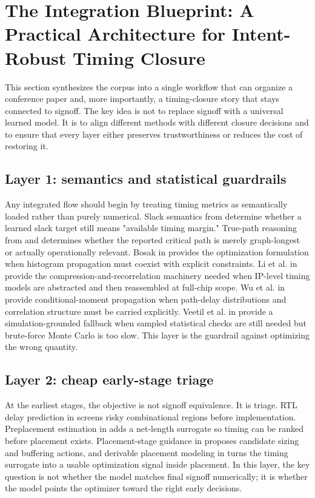 \documentclass[num-refs]{wiley-article}
\begin{document}
  \section{The Integration Blueprint: A Practical Architecture for Intent-Robust Timing Closure}

  This section synthesizes the corpus into a single workflow that can organize a conference paper and, more importantly, a timing-closure story that stays connected to signoff. The key idea is not to replace signoff with a universal learned model. It is to align different methods with different closure decisions and to ensure that every layer either preserves trustworthiness or reduces the cost of restoring it.


  \subsection{Layer 1: semantics and statistical guardrails}

  Any integrated flow should begin by treating timing metrics as semantically loaded rather than purely numerical. Slack semantics from \cite{ref50} determine whether a learned slack target still means "available timing margin." True-path reasoning from \cite{ref37} and \cite{ref40} determines whether the reported critical path is merely graph-longest or actually operationally relevant. Bosak in \cite{ref18} provides the optimization formulation when histogram propagation must coexist with explicit constraints. Li et al. in \cite{ref43} provide the compression-and-recorrelation machinery needed when IP-level timing models are abstracted and then reassembled at full-chip scope. Wu et al. in \cite{ref45} provide conditional-moment propagation when path-delay distributions and correlation structure must be carried explicitly. Veetil et al. in \cite{ref47} provide a simulation-grounded fallback when sampled statistical checks are still needed but brute-force Monte Carlo is too slow. This layer is the guardrail against optimizing the wrong quantity.


  \subsection{Layer 2: cheap early-stage triage}

  At the earliest stages, the objective is not signoff equivalence. It is triage. RTL delay prediction in \cite{ref27} screens risky combinational regions before implementation. Preplacement estimation in \cite{ref29} adds a net-length surrogate so timing can be ranked before placement exists. Placement-stage guidance in \cite{ref1} proposes candidate sizing and buffering actions, and derivable placement modeling in \cite{ref3} turns the timing surrogate into a usable optimization signal inside placement. In this layer, the key question is not whether the model matches final signoff numerically; it is whether the model points the optimizer toward the right early decisions.
\end{document}
